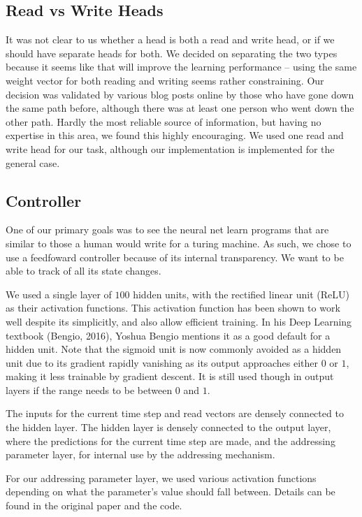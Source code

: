 \documentclass[12pt]{article}
\begin{document}
\subsection{Read vs Write Heads}

It was not clear to us whether a head is both a read and write head, or if we
should have separate heads for both. We decided on separating the two types
because it seems like that will improve the learning performance -- using the
same weight vector for both reading and writing seems rather constraining.
Our decision was validated by various blog posts online by those who have gone
down the same path before, although there was at least one person who went down
the other path. Hardly the most reliable source of information, but having
no expertise in this area, we found this highly encouraging. We used one read
and write head for our task, although our implementation is implemented for the
general case.

\subsection{Controller}

One of our primary goals was to see the neural net learn programs that are
similar to those a human would write for a turing machine. As such, we chose
to use a feedfoward controller because of its internal transparency. We want
to be able to track of all its state changes.

We used a single layer of $100$ hidden units, with the rectified linear unit (ReLU)
as their activation functions. This activation function has been shown to work
well despite its simplicitly, and also allow efficient training.
In his Deep Learning textbook (Bengio, 2016)\cite{Goodfellow-et-al-2016-Book}, Yoshua Bengio
mentions it as a good default for a hidden unit. Note that the sigmoid unit is now
commonly avoided as a hidden unit due to its gradient rapidly vanishing
as its output approaches either $0$ or $1$, making it less trainable by gradient
descent. It is still used though in output layers if the range needs to be between
$0$ and $1$.

The inputs for the current time step and read vectors are densely connected to the
hidden layer. The hidden layer is densely connected to the output layer, where the
predictions for the current time step are made, and the addressing parameter layer,
for internal use by the addressing mechanism.

For our addressing parameter layer, we used various activation functions depending
on what the parameter's value should fall between. Details can be found in
the original paper and the code.
\end{document}
